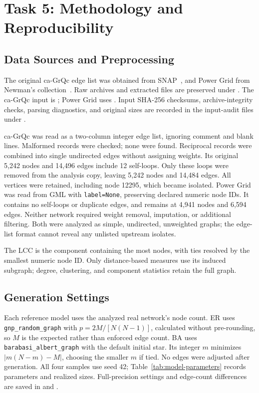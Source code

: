 \section{Task 5: Methodology and Reproducibility}

\subsection{Data Sources and Preprocessing}
The original ca-GrQc edge list was obtained from SNAP~\cite{snap-ca-grqc}, and Power Grid from Newman's collection~\cite{newman-power-grid}. Raw archives and extracted files are preserved under . The ca-GrQc input is ; Power Grid uses . Input SHA-256 checksums, archive-integrity checks, parsing diagnostics, and original sizes are recorded in the input-audit files under .

ca-GrQc was read as a two-column integer edge list, ignoring comment and blank lines. Malformed records were checked; none were found. Reciprocal records were combined into single undirected edges without assigning weights. Its original 5,242 nodes and 14,496 edges include 12 self-loops. Only these loops were removed from the analysis copy, leaving 5,242 nodes and 14,484 edges. All vertices were retained, including node 12295, which became isolated. Power Grid was read from GML with \texttt{label=None}, preserving declared numeric node IDs. It contains no self-loops or duplicate edges, and remains at 4,941 nodes and 6,594 edges. Neither network required weight removal, imputation, or additional filtering. Both were analyzed as simple, undirected, unweighted graphs; the edge-list format cannot reveal any unlisted upstream isolates.

The LCC is the component containing the most nodes, with ties resolved by the smallest numeric node ID. Only distance-based measures use its induced subgraph; degree, clustering, and component statistics retain the full graph.

\subsection{Generation Settings}
Each reference model uses the analyzed real network's node count. ER uses \texttt{gnp\_random\_graph} with $p=2M/[N(N-1)]$, calculated without pre-rounding, so $M$ is the expected rather than enforced edge count. BA uses \texttt{barabasi\_albert\_graph} with the default initial star. Its integer $m$ minimizes $|m(N-m)-M|$, choosing the smaller $m$ if tied. No edges were adjusted after generation. All four samples use seed 42; Table~\ref{tab:model-parameters} records parameters and realized sizes. Full-precision settings and edge-count differences are saved in  and .

